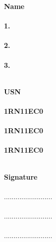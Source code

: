 \vspace{1.5cm}
\begin{minipage}[t]{0.4\textwidth}%

\textbf{\hspace{1.5cm}Name\\\\
1. \\\\
2. \\\\
3. \\\\
}
\end{minipage}\hspace{0.06cm}
\begin{minipage}[t]{0.4\textwidth}%

\textbf{\hspace{0.7cm}USN\\\\
1RN11EC0 \\\\
1RN11EC0 \\\\
1RN11EC0\\\\
}
\end{minipage}
\begin{minipage}[t]{0.4\textwidth}%

\textbf{\hspace{0.4cm}Signature}\\\\
.........................\\\\
.........................\\\\
.........................\\\\
\end{minipage}
